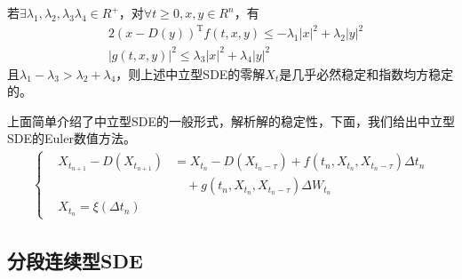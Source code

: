             \begin{theorem}[几乎必然稳定和指数均方稳定的充分条件]
                若$\exists \lambda_1,\lambda_2,\lambda_3\lambda_4\in R^+$，对$\forall t \geqslant 0,x,y\in R^n$，有
                \begin{align*}
                    &2(x-D(y))^\mathrm{T}f(t,x,y) \leqslant -\lambda_1 |x|^2 + \lambda_2|y|^2\\
                    &|g(t,x,y)|^2 \leqslant \lambda_3|x|^2+\lambda _4|y|^2
                \end{align*}
                且$\lambda_1-\lambda_3 > \lambda_2+\lambda_4$，则上述中立型SDE的零解$X_t$是几乎必然稳定和指数均方稳定的。
            \end{theorem}
            \par
            上面简单介绍了中立型SDE的一般形式，解析解的稳定性，下面，我们给出中立型SDE的Euler数值方法。
            \begin{align*}
            \left\{
                \begin{aligned}
                &X_{t_{n+1}} - D(X_{t_{n+1}}) & = X_{t_n} - D(X_{t_n-\tau}) + f(t_n,X_{t_n},X_{t_n-\tau})\Delta t_n\\
                &                            &\quad +g(t_n,X_{t_n},X_{t_n-\tau})\Delta W_{t_n}\\
                &X_{t_n} = \xi(\Delta t_n) &
                \end{aligned}
            \right.
            \end{align*}

    \subsection{分段连续型SDE}
